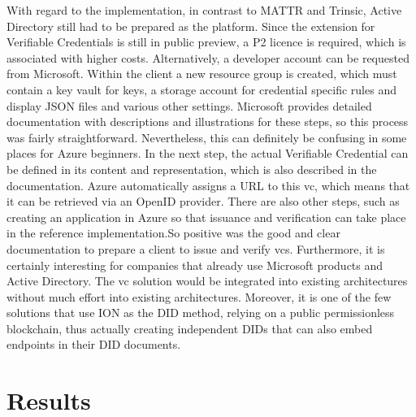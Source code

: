     With regard to the implementation, in contrast to MATTR and Trinsic, Active Directory still had to be prepared as the platform. Since the extension for Verifiable Credentials is still in public preview, a P2 licence is required, which is associated with higher costs. Alternatively, a developer account can be requested from Microsoft. Within the client a new resource group is created, which must contain a key vault for keys, a storage account for credential specific rules and display JSON files and various other settings. Microsoft provides detailed documentation with descriptions and illustrations for these steps, so this process was fairly straightforward. Nevertheless, this can definitely be confusing in some places for Azure beginners. In the next step, the actual Verifiable Credential can be defined in its content and representation, which is also described in the documentation. Azure automatically assigns a URL to this \ac{vc}, which means that it can be retrieved via an OpenID provider. There are also other steps, such as creating an application in Azure so that issuance and verification can take place in the reference implementation.So positive was the good and clear documentation to prepare a client to issue and verify \acp{vc}.  Furthermore, it is certainly interesting for companies that already use Microsoft products and Active Directory. The \ac{vc} solution would be integrated into existing architectures without much effort into existing architectures. Moreover, it is one of the few solutions that use ION as the DID method, relying on a public permissionless blockchain, thus actually creating independent \acp{DID} that can also embed endpoints in their \ac{DID} documents.
    
    
    \section{Results}\label{section: ri-results}